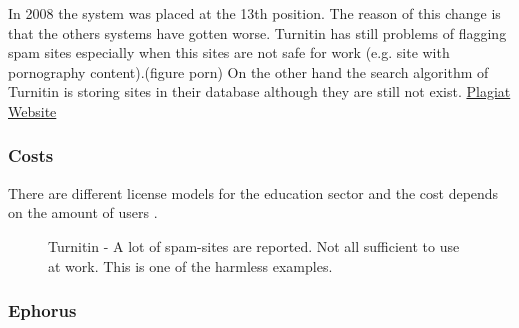 In 2008 the system was placed at the 13th position. The reason of this change is that the others systems have gotten worse. Turnitin has still problems of flagging spam sites especially when this sites are not safe for work (e.g. site with pornography content).(figure porn) On the other hand the search algorithm of Turnitin is storing sites in their database although they are still not exist.
\href{http://plagiat.htw-berlin.de/software-en/2010-2/s10-01-turnitin/}{Plagiat Website}


\subsubsection*{Costs}
There are different license models for the education sector and the cost depends on the amount of users . 

 \begin{figure}[!h]
  \centering
  \caption{Turnitin - A lot of spam-sites are reported. Not all sufficient to use at work. This is one of the harmless examples.}
  \label{fig:Turnitin overview}
\end{figure}






\newpage

\subsubsection{Ephorus}

